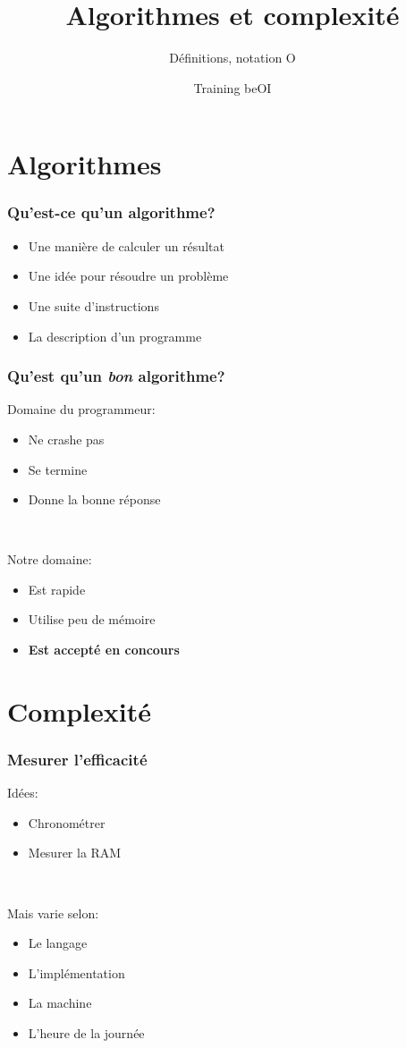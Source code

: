 \documentclass[12pt]{beamer}
\title{Algorithmes et complexité}
\subtitle{Définitions, notation O}
\author{Training beOI}
\institute{\texttt{[image: ../shared-img/beoi-logo]}}
\begin{document}
\frame{\titlepage}

\section{Algorithmes}

\begin{frame}
\frametitle{Qu'est-ce qu'un algorithme?}
\begin{itemize}
\item Une manière de calculer un résultat
\item Une idée pour résoudre un problème
\item Une suite d'instructions
\item La description d'un programme
\end{itemize}
\end{frame}

\begin{frame}
\frametitle{Qu'est qu'un \emph{bon} algorithme?}
Domaine du programmeur:
\begin{itemize}
\item Ne crashe pas
\item Se termine
\item Donne la bonne réponse
\end{itemize}

~

Notre domaine:
\begin{itemize}
\item Est rapide
\item Utilise peu de mémoire
\item \textbf{Est accepté en concours}
\end{itemize}
\end{frame}

\section{Complexité}

\begin{frame}
\frametitle{Mesurer l'efficacité}
Idées:
\begin{itemize}
\item Chronométrer
\item Mesurer la RAM
\end{itemize}

~

Mais varie selon:
\begin{itemize}
\item Le langage
\item L'implémentation
\item La machine
\item L'heure de la journée
\end{itemize}
\end{frame}
\end{document}
